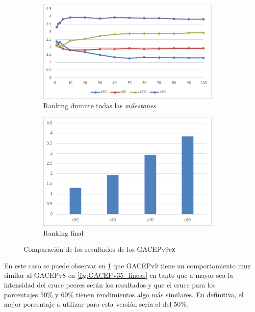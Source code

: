 \begin{figure}[h]
     \centering
     \begin{subfigure}[b]{0.45\textwidth}
         \centering
         \includegraphics[width=\textwidth]{imagenes/Experimental/GACEPv36.png}
         \caption{Ranking durante todas las \textit{milestones}}
         \label{fig:GACEPv36_lineas}
     \end{subfigure}
     \hfill
     \begin{subfigure}[b]{0.45\textwidth}
         \centering
         \includegraphics[width=\textwidth]{imagenes/Experimental/barras/GACEPv36.png}
         \caption{Ranking final}
         \label{fig:GACEPv36_barras}
     \end{subfigure}
        \caption{Comparación de los resultados de los GACEPv9c\texttt{x}}
        \label{fig:GACEPv36}
\end{figure}

En este caso se puede observar en \ref{fig:GACEPv36_lineas} que GACEPv9 tiene un comportamiento muy similar al GACEPv8 en \ref{fig:GACEPv35_lineas} en tanto que a mayor sea la intensidad del cruce peores serán los resultados y que el cruce para los porcentajes 50\% y 60\% tienen rendimientos algo más similares. 
En definitiva, el mejor porcentaje a utilizar para esta versión sería el del 50\%.

